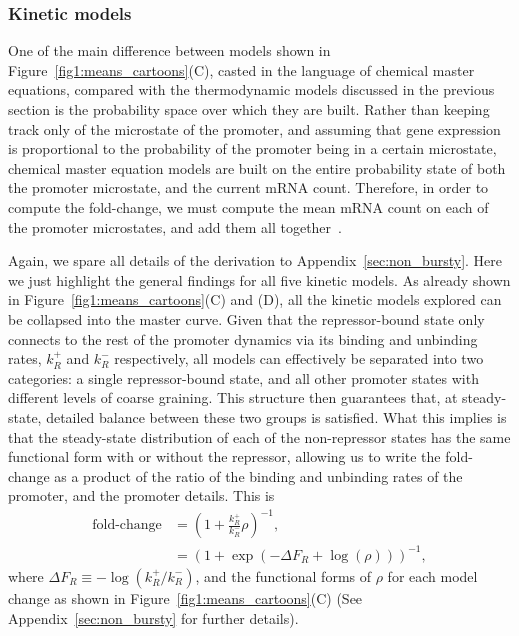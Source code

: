 \subsubsection{Kinetic models}
One of the main difference between models shown in
Figure~\ref{fig1:means_cartoons}(C), casted in the language of chemical master
equations, compared with the thermodynamic models discussed in the previous 
section is the probability space over which they are built. Rather than keeping
track only of the microstate of the promoter, and assuming that gene expression
is proportional to the probability of the promoter being in a certain
microstate, chemical master equation models are built on the entire probability
state of both the promoter microstate, and the current mRNA count. Therefore, in
order to compute the fold-change, we must compute the mean mRNA count on each of
the promoter microstates, and add them all together~\cite{Sanchez2013}.

Again, we spare all details of the derivation to Appendix~\ref{sec:non_bursty}.
Here we just highlight the general findings for all five kinetic models. As
already shown in Figure~\ref{fig1:means_cartoons}(C) and (D), all the kinetic
models explored can be collapsed into the master curve. Given that the
repressor-bound state only connects to the rest of the promoter dynamics via its
binding and unbinding rates, $k_R^+$ and $k_R^-$ respectively, all models can
effectively be separated into two categories: a single repressor-bound state,
and all other promoter states with different levels of coarse graining. This
structure then guarantees that, at steady-state, detailed balance between these
two groups is satisfied. What this implies is that the steady-state distribution
of each of the non-repressor states has the same functional form with or without
the repressor, allowing us to write the fold-change as a product of the ratio of
the binding and unbinding rates of the promoter, and the promoter details. This
is 
\begin{align}
\text{fold-change} &= \left( 1 + \frac{k_R^+}{k_R^-} \rho \right)^{-1},\\
&= (1 + \exp(-\Delta F_R + \log(\rho) ))^{-1},
\end{align}
where $\Delta F_R \equiv -\log(k_R^+/k_R^-)$, and the functional forms of $\rho$
for each model change as shown in Figure~\ref{fig1:means_cartoons}(C) (See
Appendix~\ref{sec:non_bursty} for further details).


